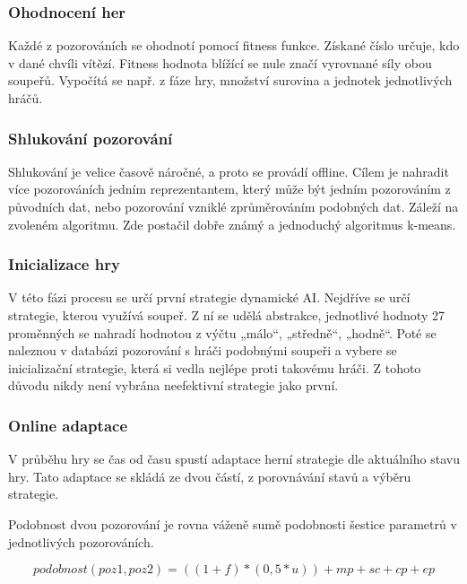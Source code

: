 \subsubsection{Ohodnocení her}

Každé z pozorováních se ohodnotí pomocí fitness funkce. Získané číslo určuje, kdo v dané chvíli vítězí. Fitness hodnota blížící se nule značí vyrovnané síly obou soupeřů. Vypočítá se např. z fáze hry, množství surovina a jednotek jednotlivých hráčů.

\subsubsection{Shlukování pozorování}

Shlukování je velice časově náročné, a proto se provádí offline. Cílem je nahradit více pozorováních jedním reprezentantem, který může být jedním pozorováním z původních dat, nebo pozorování vzniklé zprůměrováním podobných dat. Záleží na zvoleném algoritmu. Zde postačil dobře známý a jednoduchý algoritmus k-means.

\subsubsection{Inicializace hry}

V této fázi procesu se určí první strategie dynamické AI. Nejdříve se určí strategie, kterou využívá soupeř. Z ní se udělá abstrakce, jednotlivé hodnoty 27 proměnných se nahradí hodnotou z výčtu „málo“, „středně“, „hodně“.  Poté se naleznou v databázi pozorování s hráči podobnými soupeři a vybere se inicializační strategie, která si vedla nejlépe proti takovému hráči. Z tohoto důvodu nikdy není vybrána neefektivní strategie jako první.

\subsubsection{Online adaptace}

V průběhu hry se čas od času spustí adaptace herní strategie dle aktuálního stavu hry. Tato adaptace se skládá ze dvou částí, z porovnávání stavů a výběru strategie.

Podobnost dvou pozorování je rovna váženě sumě podobnosti šestice parametrů v jednotlivých pozorováních.

\begin{equation}
	   podobnost(poz1,poz2)=((1+f)*(0,5*u)) + mp + sc + cp + ep
\end{equation}

